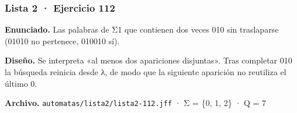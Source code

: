 
\hypertarget{lista-2-ejercicio-112}{%
\subsubsection{Lista 2 · Ejercicio 112}\label{lista-2-ejercicio-112}}

\textbf{Enunciado.} Las palabras de Σ1 que contienen dos veces 010 sin traslaparse (01010 no pertenece, 010010 sí).

\textbf{Diseño.} Se interpreta «al menos dos apariciones disjuntas». Tras completar 010 la búsqueda reinicia desde λ, de modo que la siguiente aparición no reutiliza el último 0.

\textbf{Archivo.} \texttt{automatas/lista2/lista2-112.jff} · Σ = \{0, 1, 2\} · \textbar Q\textbar{} = 7

